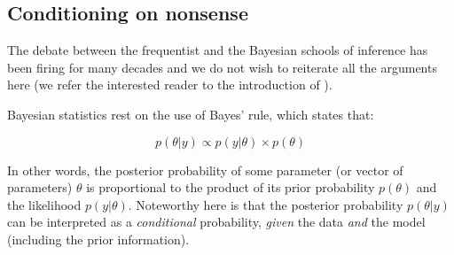\documentclass[a4paper,man,natbib,floatsintext,donotrepeattitle]{apa6}
\begin{document}




\subsection{Conditioning on nonsense}

The debate between the frequentist and the Bayesian schools of inference has been firing for many decades and we do not wish to reiterate all the arguments here (we refer the interested reader to the introduction of \citealp{albers_credible_2018}).

Bayesian statistics rest on the use of Bayes' rule, which states that:

$$ p(\theta|y) \propto p(y|\theta) \times p(\theta) $$

In other words, the posterior probability of some parameter (or vector of parameters) $\theta$ is proportional to the product of its prior probability $p(\theta)$ and the likelihood $p(y|\theta)$. Noteworthy here is that the posterior probability $p(\theta|y)$ can be interpreted as a \textit{conditional} probability, \textit{given} the data \textit{and} the model (including the prior information).
\end{document}
